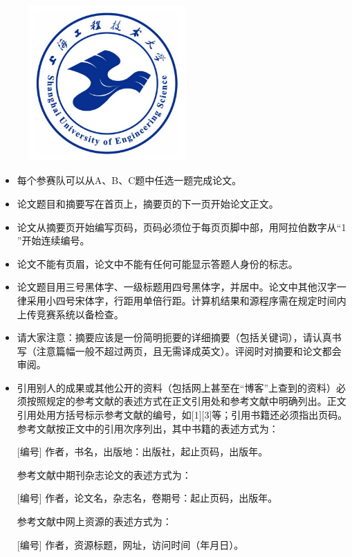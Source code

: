 \documentclass[bwprint]{suesmmthesis}
\begin{document}
    \begin{center}
        \begin{figure}
            \centering
            \includegraphics[width=6cm,height=6cm]{sues-logo.jpg}
        \end{figure}
        \xinwei{}

        \xinwei{}

        \xinwei{}
    \end{center}

    \vspace{0.5cm}
    \begin{itemize}\fangsong
        \item 每个参赛队可以从A、B、C题中任选一题完成论文。
        \item 论文题目和摘要写在首页上，摘要页的下一页开始论文正文。
        \item 论文从摘要页开始编写页码，页码必须位于每页页脚中部，用阿拉伯数字从“1 ”开始连续编号。
        \item 论文不能有页眉，论文中不能有任何可能显示答题人身份的标志。
        \item 论文题目用三号黑体字、一级标题用四号黑体字，并居中。论文中其他汉字一律采用小四号宋体字，行距用单倍行距。计算机结果和源程序需在规定时间内上传竞赛系统以备检查。
        \item 请大家注意：摘要应该是一份简明扼要的详细摘要（包括关键词），请认真书写（注意篇幅一般不超过两页，且无需译成英文）。评阅时对摘要和论文都会审阅。
        \item 引用别人的成果或其他公开的资料（包括网上甚至在“博客”上查到的资料）必须按照规定的参考文献的表述方式在正文引用处和参考文献中明确列出。正文引用处用方括号标示参考文献的编号，如[1][3]等；引用书籍还必须指出页码。参考文献按正文中的引用次序列出，其中书籍的表述方式为：
        
        \hspace{2em}[编号] 作者，书名，出版地：出版社，起止页码，出版年。

        参考文献中期刊杂志论文的表述方式为：

        \hspace{2em}[编号] 作者，论文名，杂志名，卷期号：起止页码，出版年。

        参考文献中网上资源的表述方式为：

        \hspace{2em}[编号] 作者，资源标题，网址，访问时间（年月日）。
    \end{itemize}
\end{document}

